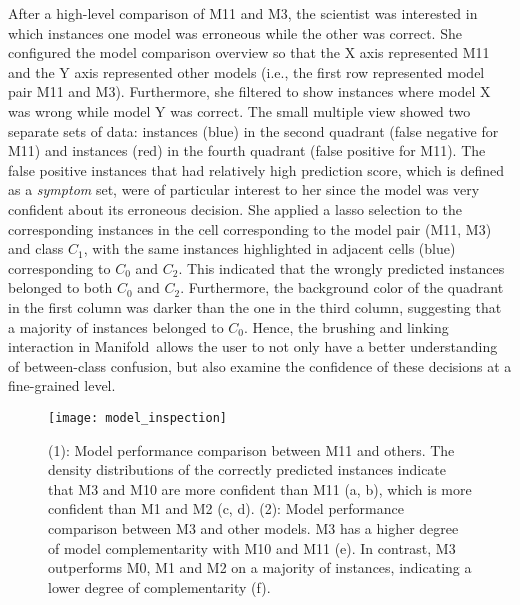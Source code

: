 \documentclass[preprint,journal]{vgtc}       %
\newcommand{\techname}{Manifold}
\begin{document}
After a high-level comparison of M11 and M3, the scientist was interested in which instances one model was erroneous while the other was correct. She configured the model comparison overview so that the X axis represented M11 and the Y axis represented other models (i.e., the first row represented model pair M11 and M3). Furthermore, she filtered to show instances where model X was wrong while model Y was correct. The small multiple view showed two separate sets of data: instances (blue) in the second quadrant (false negative for M11) and instances (red) in the fourth quadrant (false positive for M11). The false positive instances that had relatively high prediction score, which is defined as a \textit{symptom} set, were of particular interest to her since the model was very confident about its erroneous decision. She applied a lasso selection to the corresponding instances in the cell corresponding to the model pair (M11, M3) and class $C_1$, with the same instances highlighted in adjacent cells (blue) corresponding to $C_0$ and $C_2$. This indicated that the wrongly predicted instances belonged to both $C_0$ and $C_2$. Furthermore, the background color of the quadrant in the first column was darker than the one in the third column, suggesting that a majority of instances belonged to $C_0$. Hence, the brushing and linking interaction in \techname\ allows the user to not only have a better understanding of between-class confusion, but also examine the confidence of these decisions at a fine-grained level.


\begin{figure}[t]
 \centering
 \texttt{[image: model\_inspection]}
 \caption{(1): Model performance comparison between M11 and others. The density distributions of the correctly predicted instances indicate that M3 and M10 are more confident than M11 (a, b), which is more confident than M1 and M2 (c, d). (2): Model performance comparison between M3 and other models. M3 has a higher degree of model complementarity with M10 and M11 (e). In contrast, M3 outperforms M0, M1 and M2 on a majority of instances, indicating a lower degree of complementarity (f).
 }
 \label{fig:inspection}
\end{figure}
\end{document}
